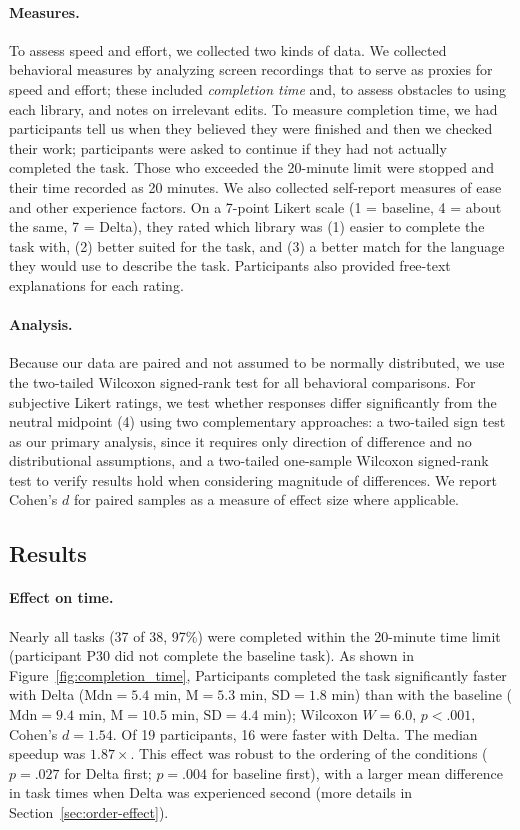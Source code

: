 \paragraph{Measures.} To assess speed and effort, we collected two kinds of data. We collected behavioral measures by analyzing screen recordings that to serve as proxies for speed and effort; these included \textit{completion time} and, to assess obstacles to using each library, and notes on irrelevant edits. To measure completion time, we had participants tell us when they believed they were finished and then we checked their work; participants were asked to continue if they had not actually completed the task. Those who exceeded the 20-minute limit were stopped and their time recorded as 20 minutes. We also collected self-report measures of ease and other experience factors. On a 7-point Likert scale (1 = baseline, 4 = about the same, 7 = Delta), they rated which library was (1) easier to complete the task with, (2) better suited for the task, and (3) a better match for the language they would use to describe the task. Participants also provided free-text explanations for each rating.

\paragraph{Analysis.} Because our data are paired and not assumed to be normally distributed, we use the two-tailed Wilcoxon signed-rank test for all behavioral comparisons. For subjective Likert ratings, we test whether responses differ significantly from the neutral midpoint (4) using two complementary approaches: a two-tailed sign test as our primary analysis, since it requires only direction of difference and no distributional assumptions, and a two-tailed one-sample Wilcoxon signed-rank test to verify results hold when considering magnitude of differences. We report Cohen's $d$ for paired samples as a measure of effect size where applicable.

\subsection{Results}

\paragraph{Effect on time.}
Nearly all tasks (37 of 38, 97\%) were completed within the 20-minute time limit (participant P30 did not complete the baseline task). As shown in Figure~\ref{fig:completion_time}, Participants completed the task significantly faster with Delta ($\text{Mdn} = 5.4$ min, $\text{M} = 5.3$ min, $\text{SD} = 1.8$ min) than with the baseline ($\text{Mdn} = 9.4$ min, $\text{M} = 10.5$ min, $\text{SD} = 4.4$ min); Wilcoxon $W = 6.0$, $p < .001$, Cohen's $d = 1.54$. Of 19 participants, 16 were faster with Delta. The median speedup was $1.87\times$. This effect was robust to the ordering of the conditions ($p = .027$ for Delta first; $p = .004$ for baseline first), with a larger mean difference in task times when Delta was experienced second (more details in Section~\ref{sec:order-effect}).

